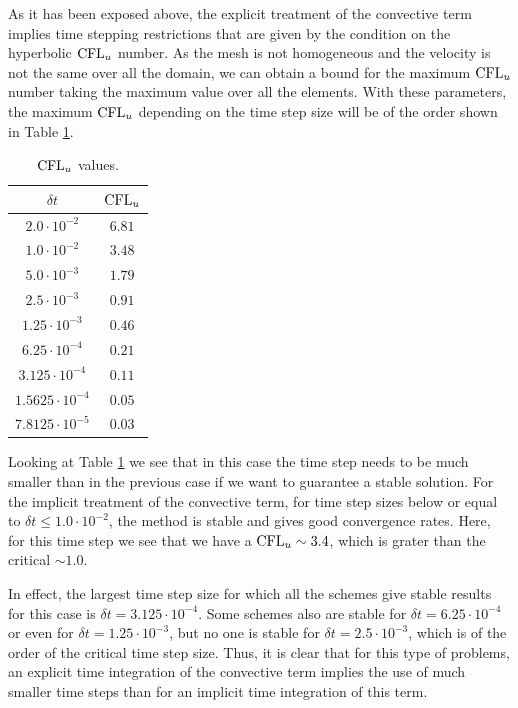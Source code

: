 As it has been exposed above, the explicit treatment of the convective term implies time stepping restrictions that are given by the condition on the hyperbolic ${\rm CFL}_u$ number. As the mesh is not homogeneous and the velocity is not the same over all the domain, we can obtain a bound for the maximum ${\rm CFL}_u$ number taking the maximum value over all the elements. %
 With these parameters, the maximum ${\rm CFL}_u$ depending on the time step size will be of the order shown in Table \ref{tab:CFLu_cyl}.

\begin{table}[h]
\caption{${\rm CFL}_u$ values.}
\label{tab:CFLu_cyl}
\centering
\begin{tabular}{cc}
\toprule
$\delta t$&${\rm CFL}_u$\\
\midrule
\midrule
$2.0\cdot10^{-2}$&$6.81$\\
$1.0\cdot10^{-2}$&$3.48$\\
$5.0\cdot10^{-3}$&$1.79$\\
$2.5\cdot10^{-3}$&$0.91$\\
$1.25\cdot10^{-3}$&$0.46$\\
$6.25\cdot10^{-4}$&$0.21$\\
$3.125\cdot10^{-4}$&$0.11$\\
$1.5625\cdot10^{-4}$&$0.05$\\
$7.8125\cdot10^{-5}$&$0.03$\\
\bottomrule
\end{tabular}
\end{table}

Looking at Table \ref{tab:CFLu_cyl} we see that in this case the time step needs to be much smaller than in the previous case if we want to guarantee a stable solution. For the implicit treatment of the convective term, for time step sizes below or equal to  $\delta t\leq 1.0\cdot10^{-2}$, the method is stable and gives good convergence rates. Here, for this time step we see that we have a ${\rm CFL}_u\sim3.4$, which is grater than the critical $\sim1.0$. %

In effect, the largest time step size for which all the schemes give stable results for this case is $\delta t=3.125\cdot10^{-4}$. Some schemes also are stable for $\delta t=6.25\cdot10^{-4}$ or even for $\delta t=1.25\cdot10^{-3}$, but no one is stable for $\delta t=2.5\cdot10^{-3}$, which is of the order of the critical time step size. Thus, it is clear that for this type of problems, an explicit time integration of the convective term implies the use of much smaller time steps than for an implicit time integration of this term.

